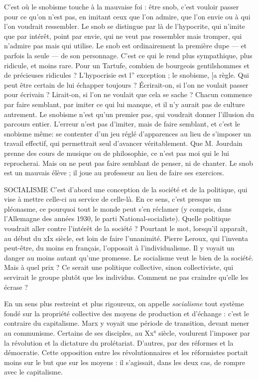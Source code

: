 C’est où le snobisme touche à la mauvaise foi : être snob, c’est vouloir
passer pour ce qu'on n’est pas, en imitant ceux que l’on admire, que l’on envie
ou à qui l’on voudrait ressembler. Le snob se distingue par là de l’hypocrite, qui
n'imite que par intérêt, point par envie, qui ne veut pas ressembler mais
tromper, qui n'admire pas mais qui utilise. Le snob est ordinairement la première dupe —
et parfois la seule — de son personnage. C’est ce qui le rend plus
sympathique, plus ridicule, et moins rare. Pour un Tartufe, combien de bourgeois
gentilshommes et de précieuses ridicules ? L’hypocrisie est l” exception ; le
snobisme, [a règle. Qui peut être certain de lui échapper toujours ? Écrirait-on,
si l’on ne voulait passer pour écrivain ? Lirait-on, si l’on ne voulait que cela se
sache ? Chacun commence par faire semblant, par imiter ce qui lui manque, et
il n’y aurait pas de culture autrement. Le snobisme n’est qu’un premier pas, qui
voudrait donner l'illusion du parcours entier. L'erreur n’est pas d’imiter, mais
de faire semblant, et c’est le snobisme même: se contenter d’un jeu réglé
d’apparences au lieu de s'imposer un travail effectif, qui permettrait seul
d'avancer véritablement. Que M. Jourdain prenne des cours de musique ou de
philosophie, ce n’est pas moi qui le lui reprocherai. Mais on ne peut pas faire
semblant de penser, ni de chanter. Le snob est un mauvais élève ; il joue au professeur
au lieu de faire ses exercices.

SOCIALISME C'est d’abord une conception de la société et de la politique,
qui vise à mettre celle-ci au service de celle-là. En ce sens,
c'est presque un pléonasme, ce pourquoi tout le monde peut s’en réclamer (y
compris, dans l’Allemagne des années 1930, le parti National-socialiste).
Quelle politique voudrait aller contre l'intérêt de la société ? Pourtant le mot,
lorsqu'il apparaît, au début du xIx siècle, est loin de faire l’unanimité. Pierre
Leroux, qui l’inventa peut-être, du moins en français, l’opposait à l’individualisme.
Il y voyait un danger au moins autant qu’une promesse. Le socialisme
veut le bien de la société. Mais à quel prix ? Ce serait une politique collective,
sinon collectiviste, qui servirait le groupe plutôt que les individus. Comment
ne pas craindre qu’elle les écrase ?

En un sens plus restreint et plus rigoureux, on appelle {\it socialisme} tout système
fondé sur la propriété collective des moyens de production et d’échange :
c’est le contraire du capitalisme. Marx y voyait une période de transition,
devant mener au communisme. Certains de ses disciples, au Xx° siècle, voulurent
l’imposer par la révolution et la dictature du prolétariat. D’autres, par des
réformes et la démocratie. Cette opposition entre les révolutionnaires et les
réformistes portait moins sur le but que sur les moyens : il s’agissait, dans les
deux cas, de rompre avec le capitalisme.

